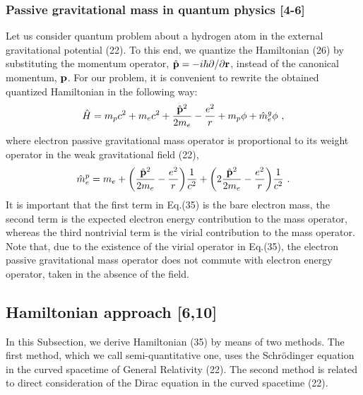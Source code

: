 \documentclass{ws-ijmpd}
\begin{document}
\subsubsection{Passive gravitational mass in quantum physics [4-6]}

Let us consider quantum problem about a hydrogen atom in the external
gravitational potential (22). To this end, we quantize the Hamiltonian
(26) by substituting the momentum operator,
$\hat{\bf p} = - i \hbar
\partial /\partial {\bf r}$, instead of the canonical momentum, ${\bf
p}$. For our problem, it is convenient to rewrite the obtained
quantized Hamiltonian in the following way:
\begin{equation}
\hat H = m_p c^2 + m_e c^2 + \frac{\hat {\bf
p}^2}{2m_e}-\frac{e^2}{r} + m_p \phi + \hat m^g_e \phi \ ,
\end{equation}
where electron passive gravitational mass operator is proportional
to its weight operator in the weak gravitational field (22),
\begin{equation}
\hat m^p_e  = m_e + \biggl(\frac{\hat {\bf p}^2}{2m_e}
-\frac{e^2}{r}\biggl)\frac{1}{c^2} + \biggl(2 \frac{\hat {\bf
p}^2}{2m_e}-\frac{e^2}{r} \biggl) \frac{1}{c^2} \ .
\end{equation}
It is important that the first term in Eq.(35) is the bare
electron mass, the second term is the expected electron energy
 contribution to the mass operator, whereas the
third nontrivial term is the virial contribution to the mass
operator. Note that, due to the existence of the virial operator
in Eq.(35), the electron passive gravitational mass operator does
not commute with electron energy operator, taken in the absence of
 the field.


\subsection{Hamiltonian approach [6,10]}
In this Subsection, we derive Hamiltonian (35) by means of two
methods. The first method, which we call semi-quantitative one,
uses the Schr\"{o}dinger equation in the curved spacetime of
General Relativity (22). The second method is related to direct
consideration of the Dirac equation in the curved spacetime (22).
\end{document}
